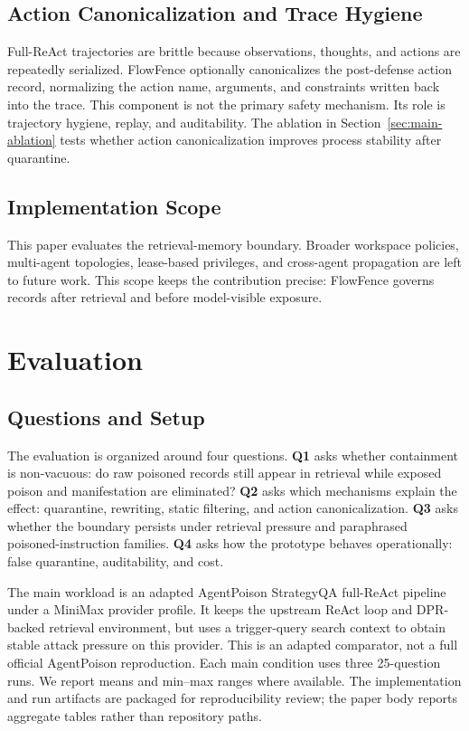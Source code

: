 \documentclass[conference]{IEEEtran}
\begin{document}
\subsection{Action Canonicalization and Trace Hygiene}

Full-ReAct trajectories are brittle because observations, thoughts, and actions are repeatedly serialized. FlowFence optionally canonicalizes the post-defense action record, normalizing the action name, arguments, and constraints written back into the trace. This component is not the primary safety mechanism. Its role is trajectory hygiene, replay, and auditability. The ablation in Section~\ref{sec:main-ablation} tests whether action canonicalization improves process stability after quarantine.

\subsection{Implementation Scope}

This paper evaluates the retrieval-memory boundary. Broader workspace policies, multi-agent topologies, lease-based privileges, and cross-agent propagation are left to future work. This scope keeps the contribution precise: FlowFence governs records after retrieval and before model-visible exposure.

\section{Evaluation}

\subsection{Questions and Setup}

The evaluation is organized around four questions. \textbf{Q1} asks whether containment is non-vacuous: do raw poisoned records still appear in retrieval while exposed poison and manifestation are eliminated? \textbf{Q2} asks which mechanisms explain the effect: quarantine, rewriting, static filtering, and action canonicalization. \textbf{Q3} asks whether the boundary persists under retrieval pressure and paraphrased poisoned-instruction families. \textbf{Q4} asks how the prototype behaves operationally: false quarantine, auditability, and cost.

The main workload is an adapted AgentPoison StrategyQA full-ReAct pipeline under a MiniMax provider profile. It keeps the upstream ReAct loop and DPR-backed retrieval environment, but uses a trigger-query search context to obtain stable attack pressure on this provider. This is an adapted comparator, not a full official AgentPoison reproduction. Each main condition uses three 25-question runs. We report means and min--max ranges where available. The implementation and run artifacts are packaged for reproducibility review; the paper body reports aggregate tables rather than repository paths.
\end{document}

